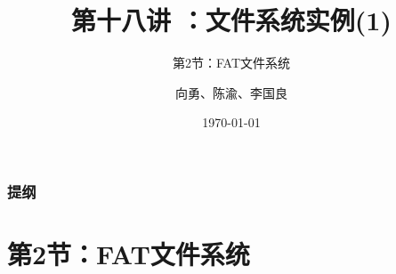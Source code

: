 


\title[第18讲]{第十八讲 ：文件系统实例(1)} %
\subtitle{第2节：FAT文件系统}
\author{向勇、陈渝、李国良} %
\date{\today} %



\begin{frame}
\titlepage %
\end{frame}

\begin{frame}
\frametitle{提纲} %
\tableofcontents %

\end{frame}
\section{第2节：FAT文件系统} %
